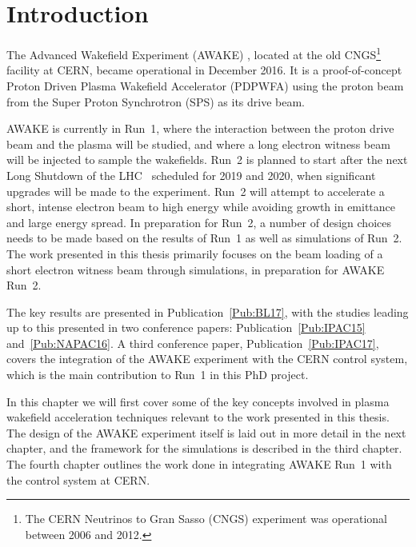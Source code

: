 %
%

\chapter{Introduction}
\label{Ch:Intro}

The Advanced Wakefield Experiment (AWAKE) \cite{awake_collaboration:2014}, located at the old CNGS\footnote{The CERN Neutrinos to Gran Sasso (CNGS) experiment was operational between 2006 and 2012.} facility at CERN, became operational in December 2016.
It is a proof-of-concept Proton Driven Plasma Wakefield Accelerator (PDPWFA) using the proton beam from the Super Proton Synchrotron (SPS) as its drive beam.

AWAKE is currently in Run~1, where the interaction between the proton drive beam and the plasma will be studied, and where a long electron witness beam will be injected to sample the wakefields.
Run~2 is planned to start after the next Long Shutdown of the LHC~\cite{bernardini:2016} scheduled for 2019 and 2020, when significant upgrades will be made to the experiment.
Run~2 will attempt to accelerate a short, intense electron beam to high energy while avoiding growth in emittance and large energy spread.
In preparation for Run~2, a number of design choices needs to be made based on the results of Run~1 as well as simulations of Run~2.
The work presented in this thesis primarily focuses on the beam loading of a short electron witness beam through simulations, in preparation for AWAKE Run~2.

The key results are presented in Publication~\ref{Pub:BL17}, with the studies leading up to this presented in two conference papers: Publication~\ref{Pub:IPAC15} and~\ref{Pub:NAPAC16}.
A third conference paper, Publication~\ref{Pub:IPAC17}, covers the integration of the AWAKE experiment with the CERN control system, which is the main contribution to Run~1 in this PhD project.

In this chapter we will first cover some of the key concepts involved in plasma wakefield acceleration techniques relevant to the work presented in this thesis.
The design of the AWAKE experiment itself is laid out in more detail in the next chapter, and the framework for the simulations is described in the third chapter.
The fourth chapter outlines the work done in integrating AWAKE Run~1 with the control system at CERN.

